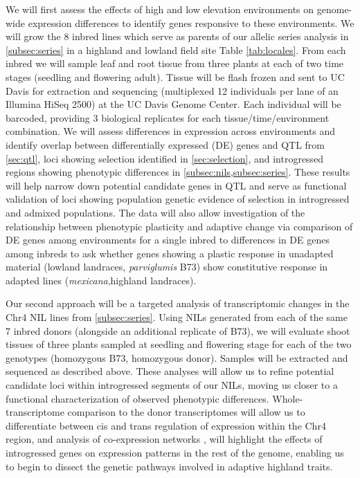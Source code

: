 We will first assess the effects of high and low elevation environments on genome-wide expression differences to identify genes responsive to these environments.  We will grow the 8 inbred lines which serve as parents of our allelic series analysis in \ref{subsec:series} in a highland and lowland field site Table \ref{tab:locales}.  From each inbred we will sample leaf and root tissue from three plants at each of two time stages (seedling and flowering adult). Tissue will be flash frozen and sent to UC Davis for extraction and sequencing (multiplexed 12 individuals per lane of an Illumina HiSeq 2500) at the UC Davis Genome Center. Each individual will be barcoded, providing 3 biological replicates for each tissue/time/environment combination. We will assess differences in expression across environments and identify overlap between differentially expressed (DE) genes and QTL from \ref{sec:qtl}, loci showing selection identified in \ref{sec:selection}, and introgressed regions showing phenotypic differences in \ref{subsec:nils,subsec:series}.   These results will help narrow down potential candidate genes in QTL and serve as functional validation of loci showing population genetic evidence of selection in introgressed and admixed populations.  The data will also allow investigation of the relationship between phenotypic plasticity and adaptive change \citep[c.f.][]{Rosas26082013} via comparison of DE genes among environments for a single inbred to differences in DE genes among inbreds to ask whether genes showing a plastic response in unadapted material (lowland landraces, \emph{parviglumis} B73) show constitutive response in adapted lines (\emph{mexicana},highland landraces).  

Our second approach will be a targeted analysis of transcriptomic changes in the Chr4 NIL lines from \ref{subsec:series}.  Using NILs generated from each of the same 7 inbred donors (alongside an additional replicate of B73), we will evaluate shoot tissues of three plants sampled at seedling and flowering stage for each of the two genotypes (homozygous B73, homozygous donor).  Samples will be extracted and sequenced as described above. These analyses will allow us to refine potential candidate loci within introgressed segments of our NILs, moving us closer to a functional characterization of observed phenotypic differences. Whole-transcriptome comparison to the donor transcriptomes will allow us to differentiate between cis and trans regulation of expression within the Chr4 region, and analysis of co-expression networks \citep[c.f.][]{Swanson-Wagner02072012}, will highlight the effects of introgressed genes on expression patterns in the rest of the genome, enabling us to begin to dissect the genetic pathways involved in adaptive highland traits.

